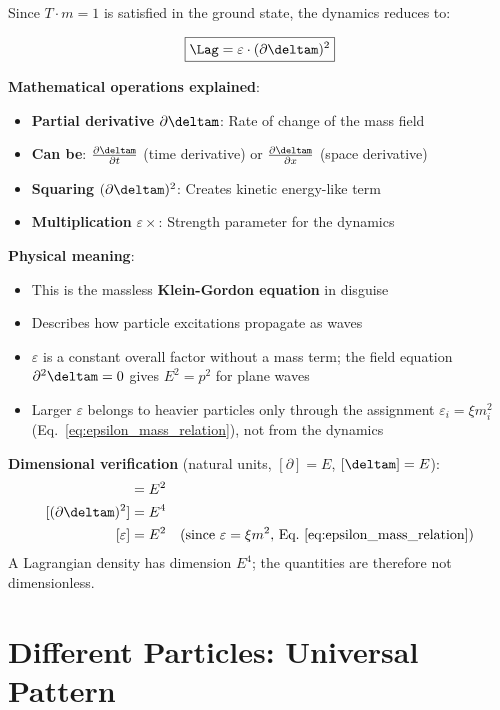 	Since $T \cdot m = 1$ is satisfied in the ground state, the dynamics reduces to:
	
	\begin{equation}
		\boxed{\Lag = \varepsilon \cdot (\partial \deltam)^2}
		\label{eq:particle_lagrangian}
	\end{equation}
	
	\textbf{Mathematical operations explained}:
	\begin{itemize}
		\item \textbf{Partial derivative} $\partial \deltam$: Rate of change of the mass field
		\item \textbf{Can be}: $\frac{\partial \deltam}{\partial t}$ (time derivative) or $\frac{\partial \deltam}{\partial x}$ (space derivative)
		\item \textbf{Squaring} $(\partial \deltam)^2$: Creates kinetic energy-like term
		\item \textbf{Multiplication} $\varepsilon \times$: Strength parameter for the dynamics
	\end{itemize}
	
	\textbf{Physical meaning}:
	\begin{itemize}
		\item This is the massless \textbf{Klein-Gordon equation} in disguise
		\item Describes how particle excitations propagate as waves
		\item $\varepsilon$ is a constant overall factor without a mass term; the field equation $\partial^2\deltam = 0$ gives $E^2 = p^2$ for plane waves
		\item Larger $\varepsilon$ belongs to heavier particles only through the assignment $\varepsilon_i = \xi m_i^2$ (Eq.~\eqref{eq:epsilon_mass_relation}), not from the dynamics
	\end{itemize}
	
	\textbf{Dimensional verification} (natural units, $[\partial] = E$, $[\deltam] = E$):
	\begin{align}
		[\partial \deltam] &= E^2 \\
		[(\partial \deltam)^2] &= E^4 \\
		[\varepsilon] &= E^2 \quad \text{(since } \varepsilon = \xi m^2\text{, Eq.~\eqref{eq:epsilon_mass_relation})}
	\end{align}
	A Lagrangian density has dimension $E^4$; the quantities are therefore not dimensionless.
	
	\section{Different Particles: Universal Pattern}
	

